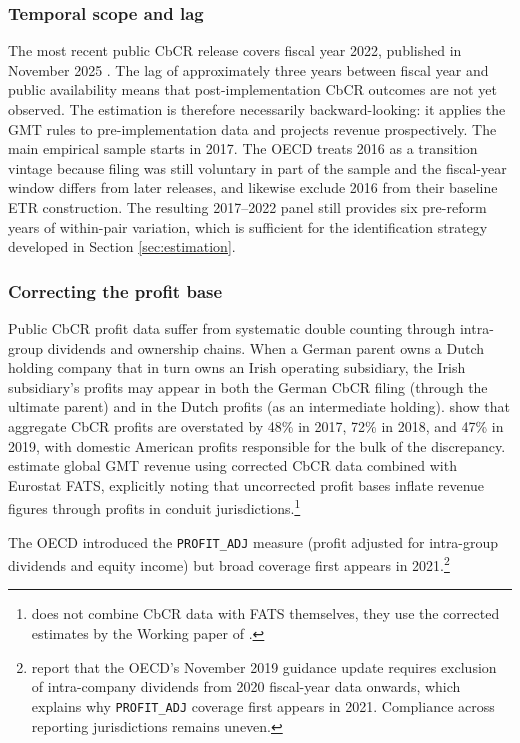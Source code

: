 \documentclass[11pt,a4paper]{article}
\newcommand{\code}[1]{\texttt{#1}}
\begin{document}
\subsubsection{Temporal scope and lag}\label{sec:temporal}

The most recent public CbCR release covers fiscal year 2022, published in November 2025 \citep{oecd2025a}. The lag of approximately three years between fiscal year and public availability means that post-implementation CbCR outcomes are not yet observed. The estimation is therefore necessarily backward-looking: it applies the GMT rules to pre-implementation data and projects revenue prospectively. The main empirical sample starts in 2017. The OECD treats 2016 as a transition vintage because filing was still voluntary in part of the sample and the fiscal-year window differs from later releases, and \citet{hugger2026} likewise exclude 2016 from their baseline ETR construction. The resulting 2017--2022 panel still provides six pre-reform years of within-pair variation, which is sufficient for the identification strategy developed in Section \ref{sec:estimation}.

\subsubsection{Correcting the profit base}\label{sec:doublecounting}

Public CbCR profit data suffer from systematic double counting through intra-group dividends and ownership chains. When a German parent owns a Dutch holding company that in turn owns an Irish operating subsidiary, the Irish subsidiary's profits may appear in both the German CbCR filing (through the ultimate parent) and in the Dutch profits (as an intermediate holding). \citet{garcia-bernardo2022a} show that aggregate CbCR profits are overstated by 48\% in 2017, 72\% in 2018, and 47\% in 2019, with domestic American profits responsible for the bulk of the discrepancy. \citet{barake2022} estimate global GMT revenue using corrected CbCR data combined with Eurostat FATS, explicitly noting that uncorrected profit bases inflate revenue figures through profits in conduit jurisdictions.\footnote{\citet{barake2022} does not combine CbCR data with FATS themselves, they use the corrected estimates by the Working paper of \citet{torslov2023}.}

The OECD introduced the \code{PROFIT\_ADJ} measure (profit adjusted for intra-group dividends and equity income) but broad coverage first appears in 2021.\footnote{\citet{boukal2026} report that the OECD's November 2019 guidance update requires exclusion of intra-company dividends from 2020 fiscal-year data onwards, which explains why \code{PROFIT\_ADJ} coverage first appears in 2021. Compliance across reporting jurisdictions remains uneven.} 
\end{document}
